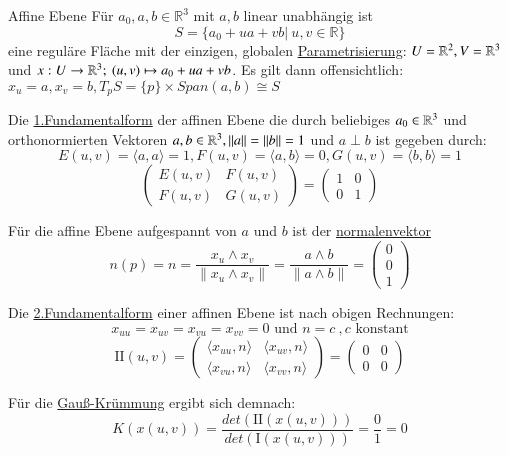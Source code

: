 \begin{titleDef}{Affine Ebene}
\label{affinEbene}
Für $a_0,a,b\in\mathbb{R}^3$ mit $a,b$ linear unabhängig ist 
$$S=\{a_0+ua+vb| \ u,v\in\mathbb{R}\}$$
eine reguläre Fläche mit der einzigen, globalen \hyperref[parametrisierung]{Parametrisierung}:
$U=\mathbb{R}^2,V=\mathbb{R}^3$ und $x:U\to\mathbb{R}^3;\: (u,v)\mapsto a_0+ua+vb$. Es gilt dann offensichtlich: $x_u=a,x_v=b,T_pS=\{p\}\times Span(a,b)\cong S$\par
Die \hyperref[fundamentalformEins]{1.Fundamentalform} der affinen Ebene die durch beliebiges $a_0\in\mathbb{R}^3$ und orthonormierten Vektoren $a,b\in\mathbb{R}^3,\lVert a\rVert=\lVert b\rVert = 1$ und $a\perp b$ ist gegeben durch:
$$E(u,v)=\langle a,a\rangle=1, F(u,v)=\langle a,b\rangle=0,G(u,v)=\langle b,b\rangle=1$$
$$\begin{pmatrix}
	E(u,v)&F(u,v)\\
	F(u,v)&G(u,v)
\end{pmatrix}=
\begin{pmatrix}
1&0\\
0&1
\end{pmatrix}$$
\par
Für die affine Ebene aufgespannt von $a$ und $b$ ist der \hyperref[normalenvektor]{normalenvektor}
$$n(p)=n=\frac{x_u\wedge x_v}{\lVert x_u\wedge x_v\rVert}=\frac{a\wedge b}{\lVert a\wedge b\rVert}=\begin{pmatrix}
	0\\0\\1
\end{pmatrix}$$
\par
Die \hyperref[fundamentalzweite]{2.Fundamentalform} einer affinen Ebene ist nach obigen Rechnungen:
$$x_{uu}=x_{uv}=x_{vu}=x_{vv}=0 \text{ und } n=c \: ,c\text{ konstant}$$
$$\mathrm{II}(u,v)=
\begin{pmatrix} 
	\langle x_{uu},n\rangle & \langle x_{uv},n\rangle\\
	\langle x_{vu},n\rangle & \langle x_{vv},n\rangle
\end{pmatrix}=
\begin{pmatrix}
	0&0\\
	0&0
\end{pmatrix}$$
\par
Für die \hyperref[gausskruemmung]{Gauß-Krümmung} ergibt sich demnach:
$$K(x(u,v))=\frac{det(\mathrm{II}(x(u,v)))}{det(\mathrm{I}(x(u,v)))}=\frac{0}{1}=0$$
\end{titleDef}


